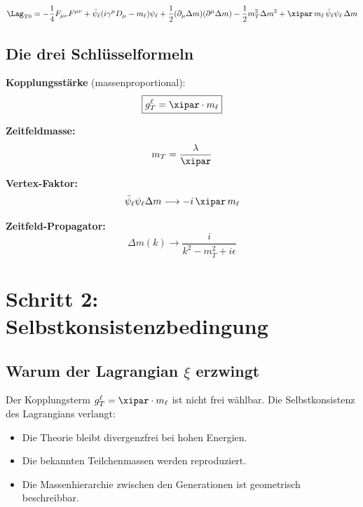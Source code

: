 \begin{keyresult}
\begin{equation}
	\Lag_{\text{T0}} = -\frac{1}{4} F_{\mu\nu}F^{\mu\nu}
	+ \bar{\psi}_\ell(i\gamma^\mu D_\mu - m_\ell)\psi_\ell
	+ \frac{1}{2}(\partial_\mu \Delta m)(\partial^\mu \Delta m)
	- \frac{1}{2} m_T^2 \Delta m^2
	+ \xipar \, m_\ell \,\bar{\psi}_\ell \psi_\ell \, \Delta m
	\label{eq:t0_lagrangian}
\end{equation}
\end{keyresult}

\subsection{Die drei Schlüsselformeln}

\textbf{Kopplungsstärke} (massenproportional):
\begin{equation}
	\boxed{g_T^\ell = \xipar \cdot m_\ell}
	\label{eq:coupling}
\end{equation}

\textbf{Zeitfeldmasse:}
\begin{equation}
	m_T = \frac{\lambda}{\xipar}
\end{equation}

\textbf{Vertex-Faktor:}
\begin{equation}
	\bar{\psi}_\ell \psi_\ell \Delta m \longrightarrow -i\,\xipar\, m_\ell
\end{equation}

\textbf{Zeitfeld-Propagator:}
\begin{equation}
	\Delta m(k) \longrightarrow \frac{i}{k^2 - m_T^2 + i\epsilon}
\end{equation}

\section{Schritt 2: Selbstkonsistenzbedingung}

\subsection{Warum der Lagrangian \texorpdfstring{$\xi$}{xi} erzwingt}

Der Kopplungsterm $g_T^\ell = \xipar \cdot m_\ell$ ist nicht frei wählbar. Die Selbstkonsistenz des Lagrangians verlangt:
\begin{itemize}
	\item Die Theorie bleibt divergenzfrei bei hohen Energien.
	\item Die bekannten Teilchenmassen werden reproduziert.
	\item Die Massenhierarchie zwischen den Generationen ist geometrisch beschreibbar.
\end{itemize}

